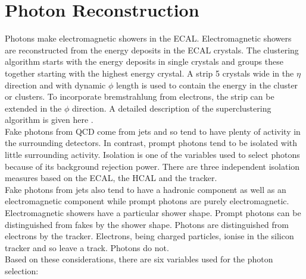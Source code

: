 \section{Photon Reconstruction}

Photons make electromagnetic showers in the ECAL. Electromagnetic showers are 
reconstructed from the energy deposits in the ECAL crystals. The clustering 
algorithm starts with the energy deposits in single crystals and groups these 
together starting with the highest energy crystal. A strip 5 crystals wide in 
the $\eta$ direction and with dynamic $\phi$ length is used to contain the 
energy in the cluster or clusters. To incorporate bremstrahlung from electrons, 
the strip can be extended in the $\phi$ direction. A detailed description of the
superclustering algorithm is given here \cite{supercluster}. \\ 

Fake photons from QCD come from jets and so tend to have plenty of activity in
the surrounding detectors. In contrast, prompt photons tend to be isolated with
little surrounding activity. Isolation is one of the variables used to select 
photons because of its background rejection power. There are three independent 
isolation measures based on the ECAL, the HCAL and the tracker. \\

Fake photons from jets also tend to have a hadronic component as well as an
electromagnetic component while prompt photons are purely electromagnetic.
Electromagnetic showers have a particular shower shape. Prompt photons can be 
distinguished from fakes by the shower shape. Photons are distinguished from 
electrons by the tracker. Electrons, being charged particles, ionise in the 
silicon tracker and so leave a track. Photons do not. \\ 

Based on these considerations, there are six variables used for the photon 
selection:

